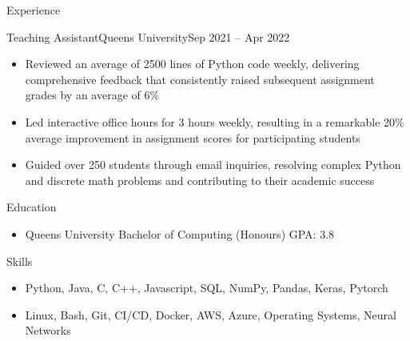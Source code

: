 \documentclass[]{mcdowellcv}
\begin{document}
\begin{cvsection}{Experience}
\begin{cvsubsection}{Teaching Assistant}{Queen\textquotesingle{}s University}{Sep 2021 -- Apr 2022}
		\begin{itemize}%
			\item Reviewed an average of 2500 lines of Python code weekly, delivering comprehensive feedback that consistently raised subsequent assignment grades by an average of 6\%
			\item Led interactive office hours for 3 hours weekly, resulting in a remarkable 20\% average improvement in assignment scores for participating students
			\item Guided over 250 students through email inquiries, resolving complex Python and discrete math problems and contributing to their academic success
		\end{itemize}
	\end{cvsubsection}
\end{cvsection}
\begin{cvsection}{Education}
	\begin{cvsubsection}{}{}{}
		\begin{itemize}
			\item Queen\textquotesingle{}s University \textbar{} Bachelor of Computing (Honours) \textbar{} GPA: 3.8
		\end{itemize}
	\end{cvsubsection}
\end{cvsection}
\begin{cvsection}{Skills}
	\begin{cvsubsection}{}{}{}
		\begin{itemize}
			\item  Python, Java, C, C++, Javascript, SQL, NumPy, Pandas, Keras, Pytorch
			\item  Linux, Bash, Git, CI/CD, Docker, AWS, Azure, Operating Systems, Neural Networks
		\end{itemize}
	\end{cvsubsection}
\end{cvsection}
\ 
\end{document}
